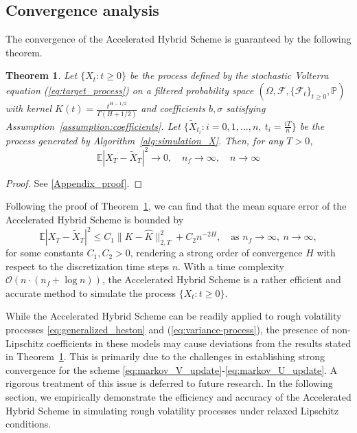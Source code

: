 \documentclass[11pt]{article}%
\newtheorem{theorem}{Theorem}
\theoremstyle{definition}
\begin{document}
\subsection{Convergence analysis}

The convergence of the Accelerated Hybrid Scheme is guaranteed by the following theorem.

\begin{theorem}\label{theorem:convergence_X}
    Let \(\{X_t: t \ge 0\}\) be the process defined by the stochastic Volterra equation (\ref{eq:target_process}) on a filtered probability space \((\Omega,\mathcal{F}, \{\mathcal{F}_t\}_{t\ge 0}, \mathbb{P})\) with kernel \(K(t) = \tfrac{t^{H-1/2}}{\Gamma(H+1/2)}\) and coefficients \(b,\sigma\) satisfying Assumption~\ref{assumption:coefficients}. Let \(\{\widetilde{X}_{t_i}:i=0,1,\ldots,n,\ t_i = \frac{iT}{n}\}\) be the process generated by Algorithm~\ref{alg:simulation_X}. Then, for any \(T>0\), 
    \[
        \mathbb{E} |X_T - \widetilde{X}_T|^2 \to 0,\quad n_f\to \infty,\quad n \to \infty
    \]
\end{theorem}

\begin{proof}
    See \ref{Appendix_proof}.
\end{proof}

Following the proof of Theorem~\ref{theorem:convergence_X}, we can find that the mean square error of the Accelerated Hybrid Scheme is bounded by
\begin{equation}\label{eq:mse_upper_bound}
\mathbb{E} |X_T - \widetilde{X}_T|^2 \le C_1 \|K - \widehat{K}\|_{2,T}^2 + C_2 n^{-2H},\quad \text{as }n_f \to \infty,\ n\to \infty,
\end{equation}
for some constants \(C_1,C_2>0\), rendering a strong order of convergence \(H\) with respect to the discretization time steps \(n\). With a time complexity \(\mathcal{O}(n\cdot (n_f + \log n))\), the Accelerated Hybrid Scheme is a rather efficient and accurate method to simulate the process \(\{X_t: t\ge 0\}\). 

While the Accelerated Hybrid Scheme can be readily applied to rough volatility processes \eqref{eq:generalized_heston} and (\ref{eq:variance-process}), the presence of non-Lipschitz coefficients in these models may cause deviations from the results stated in Theorem~\ref{theorem:convergence_X}. This is primarily due to the challenges in establishing strong convergence for the scheme \eqref{eq:markov_V_update}-\eqref{eq:markov_U_update}. A rigorous treatment of this issue is deferred to future research. In the following section, we empirically demonstrate the efficiency and accuracy of the Accelerated Hybrid Scheme in simulating rough volatility processes under relaxed Lipschitz conditions.
\end{document}
